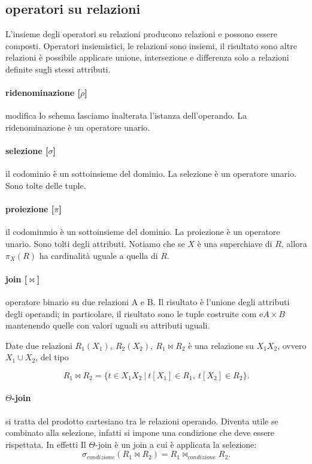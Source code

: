\documentclass{article}
\begin{document}
\subsection{operatori su relazioni}
L'insieme degli operatori su relazioni producono relazioni e possono essere
composti. Operatori insiemistici, le relazioni sono insiemi, il risultato sono
altre relazioni è possibile applicare unione, intersezione e differenza solo a
relazioni definite sugli stessi attributi.

\paragraph{ridenominazione [$\rho$]} modifica lo schema lasciamo inalterata 
l'istanza
dell'operando. La ridenominazione è un operatore unario.

\paragraph{selezione [$\sigma$]} il codominio è un sottoinsieme del dominio. 
La selezione è
un operatore unario. Sono tolte delle tuple.

\paragraph{proiezione [$\pi$]} il codominmio è un sottoinsieme del dominio. La
proiezione è un operatore unario. Sono tolti degli attributi.
Notiamo che se $X$ è una superchiave di $R$, allora $\pi_X(R)$ ha cardinalità
uguale a quella di $R$.

\paragraph{join [$\bowtie$]} operatore binario su due relazioni A e B. Il 
risultato è
l'unione degli attributi degli operandi; in particolare, il risultato sono le
tuple costruite com e$A \times B$ mantenendo quelle con valori uguali su
attributi uguali.

Date due relazioni $R_1(X_1), \ R_2(X_2), \ R_1 \bowtie R_2$ è una relazione su
$X_1X_2$, ovvero $X_1 \cup X_2$, del tipo 

\begin{equation}
	R_1 \bowtie R_2 = \{t \in X_1X_2 \ | \ t[X_1] \in R_1, \ t[X_2] \in R_2\}.
\end{equation}

\paragraph{$\Theta$-join} si tratta del prodotto cartesiano tra le relazioni
operando. Diventa utile se combinato alla selezione, infatti si impone una
condizione che deve essere rispettata. In effetti Il $\Theta$-join è un
join a cui è applicata la selezione:
\begin{equation}
	\sigma_{condizione}(R_1 \bowtie R_2) = R_1 \bowtie_{condizione} R_2.
\end{equation}
\end{document}
